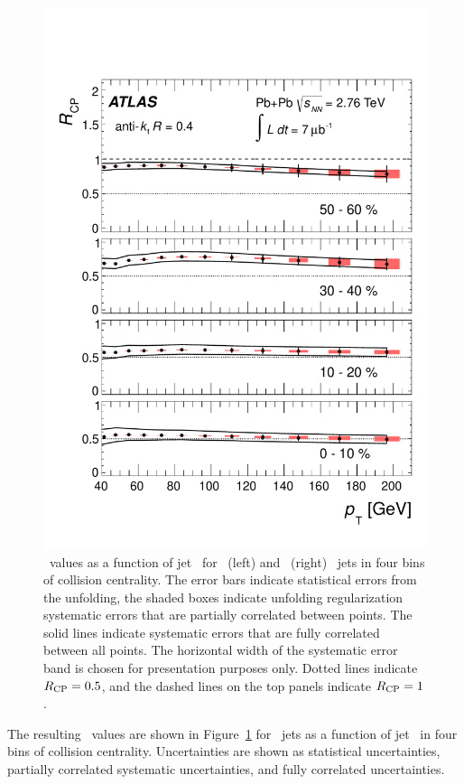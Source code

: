 \begin{figure}[!h]
\begin{center}
\includegraphics[width=0.49\mboxwidth]{jetfigures/ATLAS_jetRCP_04.pdf}
\caption{
 \Rcp\ values as a function of jet
\pT\ for \RTwo\ (left) and \RFour\ (right) \antikt\ jets
in four bins of collision centrality. The error bars indicate
statistical errors from the unfolding, the shaded boxes indicate
unfolding regularization systematic errors that are partially
correlated between points. The solid lines indicate
systematic errors that are fully correlated between all points.
The horizontal width of the systematic error band is chosen for
presentation purposes only. Dotted lines indicate $\mbox{$R_{\rm CP}$} =
0.5$, and the dashed lines on the top panels indicate $\mbox{$R_{\rm CP}$} = 1$.
}
\label{fig:GR:rcprfour}
\end{center}
\end{figure}
The resulting \Rcp\ values are shown in Figure~\ref{fig:GR:rcprfour} 
for  \RFour\ jets as a function of jet \pT\ in four bins
of collision centrality.
Uncertainties are shown as statistical uncertainties, partially correlated systematic
uncertainties, and fully correlated uncertainties.

